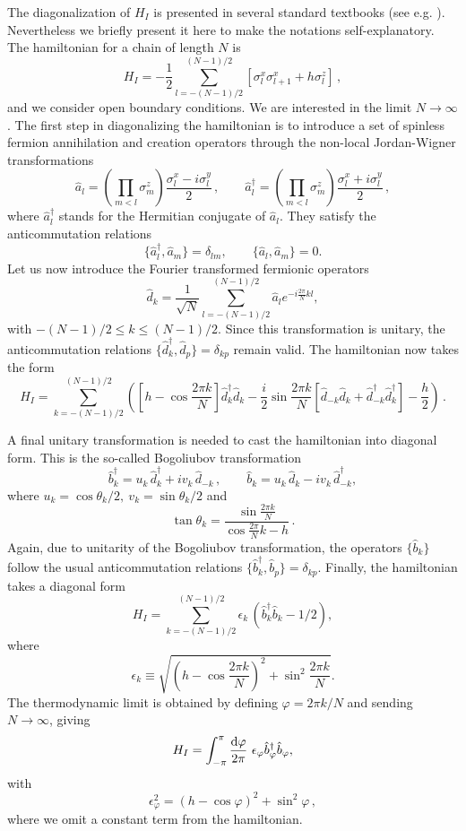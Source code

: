 \documentclass[12pt,preprint,tighten,eqsecnum,aps,floats,psfig,epsfig,amsmath,onecolumn]{revtex4-1}
\def\be{\begin{equation}}
\def\ee{\end{equation}}
\def\e{\epsilon}
\def\p{\varphi}
\def\Fa{\hat{a}}
\def\Fb{\hat{b}}
\def\Fd{\hat{d}}
\begin{document}
The diagonalization of $H_I$ is presented in several standard textbooks 
(see e.g. \cite{sach}). Nevertheless we briefly present it here to make 
the notations self-explanatory.
The hamiltonian for a chain of length $N$ is 
\be
H_I = - \frac{1}{2}\sum_{l=-({N-1})/{2}}^{({N-1})/{2}} 
[ \sigma_l^x \sigma_{l+1}^x+ h\sigma_l^z]\,,
\label{HamI}
\ee
and we consider open boundary conditions. We are interested in the limit 
$N\rightarrow\infty$. 
The first step in diagonalizing the hamiltonian is to introduce a set of 
spinless fermion annihilation and creation operators through the 
non-local Jordan-Wigner transformations
\be
\Fa_l = \left( \prod_{m<l}\sigma_m^z \right) \frac{\sigma_l^x -
 i\sigma_l^y}{2}\,, 
\qquad
\Fa_l^{\dagger} = \left( \prod_{m<l}\sigma_m^z \right) \frac{\sigma_l^x +
 i\sigma_l^y}{2}\,,
\ee
where $\Fa_l^{\dagger}$ stands for the Hermitian conjugate of $\Fa_l$.
They satisfy the anticommutation relations
\be
\{\Fa_l^{\dagger},\Fa_m\}=\delta_{lm} , \qquad\{\Fa_l,\Fa_m\} =0.
\ee
Let us now introduce the Fourier transformed fermionic operators 
\be
\Fd_k =\frac{1}{\sqrt{N}} \sum_{l=-({N-1})/{2}}^{({N-1})/{2}} 
\Fa_l e^{-i\frac{2\pi}{N}kl},
\ee 
with $-(N-1)/2 \leq k \leq (N-1)/2$. Since this transformation
is unitary, the anticommutation relations  
$\{\Fd^{\dagger}_k,\Fd_p\}=\delta_{kp}$ remain valid.
The hamiltonian now takes the form 
\be
H_I=\sum_{k=-(N-1)/2}^{(N-1)/2} 
\left(\left[h-\cos \frac{2\pi k}{N}\right] \Fd^{\dagger}_k \Fd_k - 
\frac{i}{2} \sin\frac{2\pi k}{N} 
\left[\Fd_{-k}\Fd_k + \Fd^{\dagger}_{-k} \Fd^{\dagger}_k\right]-\frac{h}{2}
\right)\,.
\ee


A final unitary transformation is needed to cast the hamiltonian into
diagonal form. This is the so-called Bogoliubov transformation 
\be
\Fb^{\dagger}_k =u_k \, \Fd^{\dagger}_k + i v_k \, \Fd_{-k}\,, \qquad 
\Fb_k = u_k \, \Fd_k - i v_k \, \Fd^{\dagger}_{-k},
\label{bogo}
\ee 
where $u_k = \cos{\theta_k/2},~ v_k = \sin{\theta_k/2}$ and
\be 
\tan{\theta_k} = \frac{\sin{\frac{2\pi k}{N}}}{
\cos{\frac{2\pi}{N}k}-h}\,.
\label{thetak}
\ee
Again, due to unitarity of the Bogoliubov transformation, the operators
$\{\Fb_k\}$ follow the usual anticommutation relations 
$\{\Fb^{\dagger}_k,\Fb_p\}=\delta_{kp}$.  
Finally, the hamiltonian takes a diagonal form 
\be
H_I=\sum_{k=-(N-1)/2}^{(N-1)/2} \e_k \, (\Fb^{\dagger}_k \Fb_k-1/2),
\label{Hambog}
\ee
where
\be
\e_k \equiv \sqrt{\left(h-\cos{\frac{2\pi k}{N}}\right)^2+ 
\sin^2{\frac{2\pi k}{N}}}.
\label{ek}
\ee
The thermodynamic limit is obtained by defining $ \p =2\pi k/N$
and sending $N\to \infty$, giving
\be 
H_I = \int^{\pi}_{-\pi}\frac{{\rm d}\p}{2\pi}\ \e_\p \Fb^{\dagger}_\p \Fb_\p, 
\ee 
with 
\be
\label{energy}
\e^2_\p = (h-\cos{\p})^2 +  \sin^2{\p}\,,  
\ee
where we omit a constant term from the hamiltonian.
\end{document}
